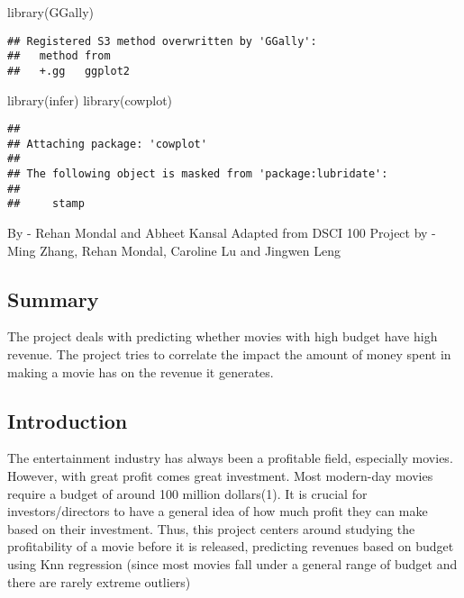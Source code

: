\documentclass[
]{article}
\newenvironment{Shaded}{\begin{snugshade}}{\end{snugshade}}
\newcommand{\FunctionTok}[1]{\textcolor[rgb]{0.00,0.00,0.00}{#1}}
\newcommand{\NormalTok}[1]{#1}
\begin{document}
\begin{Shaded}
\begin{Highlighting}[]
\FunctionTok{library}\NormalTok{(GGally)}
\end{Highlighting}
\end{Shaded}

\begin{verbatim}
## Registered S3 method overwritten by 'GGally':
##   method from   
##   +.gg   ggplot2
\end{verbatim}

\begin{Shaded}
\begin{Highlighting}[]
\FunctionTok{library}\NormalTok{(infer)}
\FunctionTok{library}\NormalTok{(cowplot)}
\end{Highlighting}
\end{Shaded}

\begin{verbatim}
## 
## Attaching package: 'cowplot'
## 
## The following object is masked from 'package:lubridate':
## 
##     stamp
\end{verbatim}

By - Rehan Mondal and Abheet Kansal Adapted from DSCI 100 Project by -
Ming Zhang, Rehan Mondal, Caroline Lu and Jingwen Leng

\hypertarget{summary}{%
\subsection{Summary}\label{summary}}

The project deals with predicting whether movies with high budget have
high revenue. The project tries to correlate the impact the amount of
money spent in making a movie has on the revenue it generates.

\hypertarget{introduction}{%
\subsection{Introduction}\label{introduction}}

The entertainment industry has always been a profitable field,
especially movies. However, with great profit comes great investment.
Most modern-day movies require a budget of around 100 million
dollars(1). It is crucial for investors/directors to have a general idea
of how much profit they can make based on their investment. Thus, this
project centers around studying the profitability of a movie before it
is released, predicting revenues based on budget using Knn regression
(since most movies fall under a general range of budget and there are
rarely extreme outliers)
\end{document}
